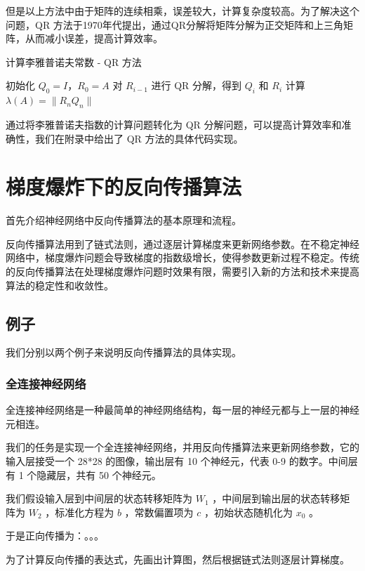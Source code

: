 \documentclass[12pt,a4paper]{amsart}
\begin{document}
但是以上方法中由于矩阵的连续相乘，误差较大，计算复杂度较高。为了解决这个问题，QR 方法于1970年代提出，通过QR分解将矩阵分解为正交矩阵和上三角矩阵，从而减小误差，提高计算效率。

\begin{algorithm}[htbp]
\caption{计算李雅普诺夫常数 - QR 方法}
\begin{algorithmic}[1]
\State 初始化 $Q_0=I$，$R_0=A$
\State 对 $R_{i-1}$ 进行 QR 分解，得到 $Q_i$ 和 $R_i$
\EndFor
\State 计算 $\lambda(A)=\|R_nQ_n\|$
\end{algorithmic}
\end{algorithm}

通过将李雅普诺夫指数的计算问题转化为 QR 分解问题，可以提高计算效率和准确性，我们在附录中给出了 QR 方法的具体代码实现。

\section{梯度爆炸下的反向传播算法}

首先介绍神经网络中反向传播算法的基本原理和流程。

反向传播算法用到了链式法则，通过逐层计算梯度来更新网络参数。在不稳定神经网络中，梯度爆炸问题会导致梯度的指数级增长，使得参数更新过程不稳定。传统的反向传播算法在处理梯度爆炸问题时效果有限，需要引入新的方法和技术来提高算法的稳定性和收敛性。

\subsection{例子}

我们分别以两个例子来说明反向传播算法的具体实现。

\subsubsection{全连接神经网络}

全连接神经网络是一种最简单的神经网络结构，每一层的神经元都与上一层的神经元相连。

我们的任务是实现一个全连接神经网络，并用反向传播算法来更新网络参数，它的输入层接受一个 28*28 的图像，输出层有 10 个神经元，代表 0-9 的数字。中间层有 1 个隐藏层，共有 50 个神经元。

我们假设输入层到中间层的状态转移矩阵为 $W_1$ ，中间层到输出层的状态转移矩阵为 $W_2$ ，标准化方程为 $b$ ，常数偏置项为 $c$ ，初始状态随机化为 $x_0$ 。

于是正向传播为：。。。

为了计算反向传播的表达式，先画出计算图，然后根据链式法则逐层计算梯度。
\end{document}
